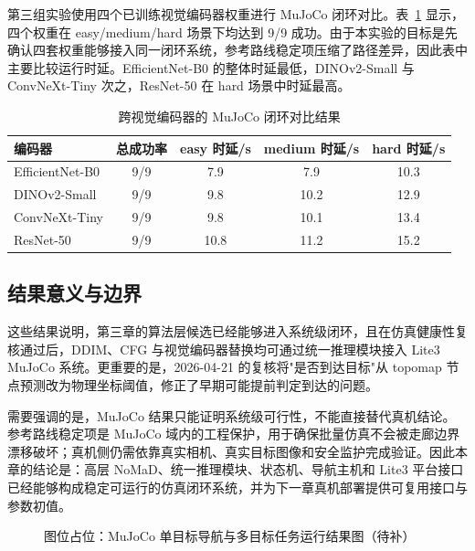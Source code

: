 第三组实验使用四个已训练视觉编码器权重进行 MuJoCo 闭环对比。表~\ref{tab:mujoco-encoder-closed-loop} 显示，四个权重在 easy/medium/hard 场景下均达到 9/9 成功。由于本实验的目标是先确认四套权重能够接入同一闭环系统，参考路线稳定项压缩了路径差异，因此表中主要比较运行时延。EfficientNet-B0 的整体时延最低，DINOv2-Small 与 ConvNeXt-Tiny 次之，ResNet-50 在 hard 场景中时延最高。

\begin{table}[htbp]
    \centering
    \caption{跨视觉编码器的 MuJoCo 闭环对比结果}
    \label{tab:mujoco-encoder-closed-loop}
    \begin{tabular}{lcccc}
        \toprule
        编码器 & 总成功率 & easy 时延/s & medium 时延/s & hard 时延/s \\
        \midrule
        EfficientNet-B0 & 9/9 & 7.9 & 7.9 & 10.3 \\
        DINOv2-Small & 9/9 & 9.8 & 10.2 & 12.9 \\
        ConvNeXt-Tiny & 9/9 & 9.8 & 10.1 & 13.4 \\
        ResNet-50 & 9/9 & 10.8 & 11.2 & 15.2 \\
        \bottomrule
    \end{tabular}
\end{table}

\subsection{结果意义与边界}

这些结果说明，第三章的算法层候选已经能够进入系统级闭环，且在仿真健康性复核通过后，DDIM、CFG 与视觉编码器替换均可通过统一推理模块接入 Lite3 MuJoCo 系统。更重要的是，2026-04-21 的复核将"是否到达目标"从 topomap 节点预测改为物理坐标阈值，修正了早期可能提前判定到达的问题。

需要强调的是，MuJoCo 结果只能证明系统级可行性，不能直接替代真机结论。参考路线稳定项是 MuJoCo 域内的工程保护，用于确保批量仿真不会被走廊边界漂移破坏；真机侧仍需依靠真实相机、真实目标图像和安全监护完成验证。因此本章的结论是：高层 NoMaD、统一推理模块、状态机、导航主机和 Lite3 平台接口已经能够构成稳定可运行的仿真闭环系统，并为下一章真机部署提供可复用接口与参数初值。

\begin{figure}[htbp]
    \centering
    \fbox{\rule{0pt}{52mm}\rule{0.86\linewidth}{0pt}}
    \caption{图位占位：MuJoCo 单目标导航与多目标任务运行结果图（待补）}
    \label{fig:framework-mujoco-results-placeholder}
\end{figure}

